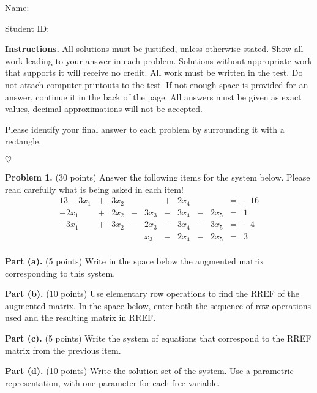 \documentclass[12pt]{article}
\begin{document}
Name: \hrulefill

\bigskip
Student ID: \hrulefill

\bigskip
\textbf{Instructions.} All solutions must be justified, unless otherwise stated. Show all work leading to your answer in each problem. Solutions without appropriate work that supports it will receive no credit. All work must be written in the test. Do not attach computer printouts to the test. If not enough space is provided for an answer, continue it in the back of the page. All answers must be given as exact values, decimal approximations will not be accepted.

Please identify your final answer to each problem by surrounding it with a rectangle.

\vfill
\hfill$\heartsuit$

\clearpage

\textbf{Problem 1.} (30 points)
Answer the following items for the system below. Please read carefully what is being asked in each item!
\begin{alignat*}{13}
- 3 x_{1} &{}+{}& 3 x_{2}&{}{}& &{}+{}& 2 x_{4}&{}{}& &{}={}&-16\\ 
- 2 x_{1} &{}+{}& 2 x_{2} &{}-{}& 3 x_{3} &{}-{}& 3 x_{4} &{}-{}& 2 x_{5} &{}={}&1\\ 
- 3 x_{1} &{}+{}& 3 x_{2} &{}-{}& 2 x_{3} &{}-{}& 3 x_{4} &{}-{}& 3 x_{5} &{}={}&-4\\ 
&{}{}&&{}{}&x_{3} &{}-{}& 2 x_{4} &{}-{}& 2 x_{5} &{}={}&3\\ 
\end{alignat*}

\textbf{Part (a).} (5 points) Write in the space below the augmented matrix corresponding to this system.

\vskip1.5in

\textbf{Part (b).} (10 points) Use elementary row operations to find the RREF of the augmented matrix. In the space below, enter both the sequence of row operations used and the resulting matrix in RREF.

\clearpage

\textbf{Part (c).} (5 points) Write the system of equations that correspond to the RREF matrix from the previous item.

\vskip3in

\textbf{Part (d).} (10 points) Write the solution set of the system. Use a parametric representation, with one parameter for each free variable.

\clearpage
\end{document}
